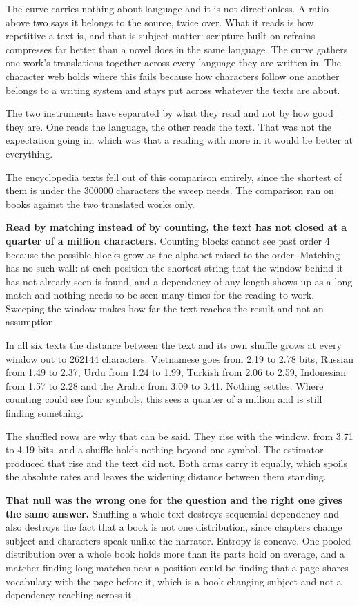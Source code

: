 The curve carries nothing about language and it is not directionless. A ratio above two says it belongs to the source, twice over. What it reads is how repetitive a text is, and that is subject matter: scripture built on refrains compresses far better than a novel does in the same language. The curve gathers one work's translations together across every language they are written in. The character web holds where this fails because how characters follow one another belongs to a writing system and stays put across whatever the texts are about.

The two instruments have separated by what they read and not by how good they are. One reads the language, the other reads the text. That was not the expectation going in, which was that a reading with more in it would be better at everything.

The encyclopedia texts fell out of this comparison entirely, since the shortest of them is under the 300000 characters the sweep needs. The comparison ran on books against the two translated works only.

\textbf{Read by matching instead of by counting, the text has not closed at a quarter of a million characters.} Counting blocks cannot see past order 4 because the possible blocks grow as the alphabet raised to the order. Matching has no such wall: at each position the shortest string that the window behind it has not already seen is found, and a dependency of any length shows up as a long match and nothing needs to be seen many times for the reading to work. Sweeping the window makes how far the text reaches the result and not an assumption.

In all six texts the distance between the text and its own shuffle grows at every window out to 262144 characters. Vietnamese goes from 2.19 to 2.78 bits, Russian from 1.49 to 2.37, Urdu from 1.24 to 1.99, Turkish from 2.06 to 2.59, Indonesian from 1.57 to 2.28 and the Arabic from 3.09 to 3.41. Nothing settles. Where counting could see four symbols, this sees a quarter of a million and is still finding something.

The shuffled rows are why that can be said. They rise with the window, from 3.71 to 4.19 bits, and a shuffle holds nothing beyond one symbol. The estimator produced that rise and the text did not. Both arms carry it equally, which spoils the absolute rates and leaves the widening distance between them standing.

\textbf{That null was the wrong one for the question and the right one gives the same answer.} Shuffling a whole text destroys sequential dependency and also destroys the fact that a book is not one distribution, since chapters change subject and characters speak unlike the narrator. Entropy is concave. One pooled distribution over a whole book holds more than its parts hold on average, and a matcher finding long matches near a position could be finding that a page shares vocabulary with the page before it, which is a book changing subject and not a dependency reaching across it.

